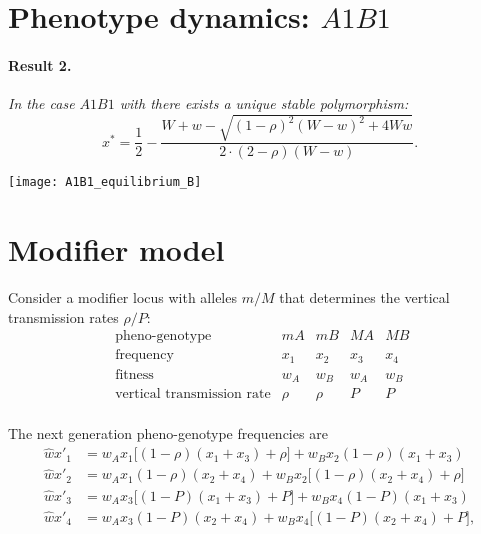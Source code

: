 \documentclass[a0,landscape]{a0poster}
\begin{document}
\begin{multicols}{4}
\columnbreak

\section*{Phenotype dynamics: $A1B1$}

\paragraph*{Result 2.}\textit{In the case $A1B1$ with there exists a unique stable polymorphism:
\begin{equation}
x^* =\frac{1}{2} -\frac{W+w-\sqrt{\left(1-\rho\right)^2\left(W-w\right)^2 +4Ww}}{2\cdot(2-\rho)(W-w)}.
\end{equation}
}

\begin{center}\vspace{1cm}
\texttt{[image: A1B1\_equilibrium\_B]}
\end{center}\vspace{1cm}

\section*{Modifier model}

Consider a modifier locus with alleles $m/M$ that determines the vertical transmission rates $\rho/P$:
\begin{equation}
\begin{matrix}
 \text{ pheno-genotype}&mA&mB&MA&MB\\
 \text{ frequency}&x_1&x_2&x_3&x_4\\
 \text{ fitness}&w_A&w_B&w_A&w_B\\
 \text{ vertical transmission rate}&\rho&\rho&P&P\\
\end{matrix}
\end{equation}

The next generation pheno-genotype frequencies are
\begin{equation}
\begin{aligned}
\hat{w}x'_1 &= w_A x_1\bigl[(1-\rho)(x_1+x_3) +\rho\bigr] +w_B x_2(1-\rho)(x_1+x_3)\\
\hat{w}x'_2 &= w_A x_1(1-\rho)(x_2+x_4) +w_B x_2\bigl[(1-\rho)(x_2+x_4)+\rho\bigr]\\ 
\hat{w}x'_3 &= w_A x_3\bigl[(1-P)(x_1+x_3) +P\bigr] +w_B x_4(1-P)(x_1+x_3)\\
\hat{w}x'_4 &= w_A x_3(1-P)(x_2+x_4) +w_B x_4\bigl[(1-P)(x_2+x_4)+P\bigr], 
\end{aligned}
\end{equation}


\end{multicols}
\end{document}
